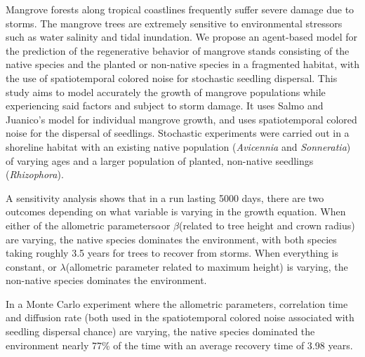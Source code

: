 Mangrove forests along tropical coastlines frequently suffer severe
damage due to storms. The mangrove trees are extremely sensitive to
environmental stressors such as water salinity and tidal inundation. We
propose an agent-based model for the prediction of the regenerative
behavior of mangrove stands consisting of the native species and the
planted or non-native species in a fragmented habitat, with the use of
spatiotemporal colored noise for stochastic seedling dispersal. This
study aims to model accurately the growth of mangrove populations while
experiencing said factors and subject to storm damage. It uses Salmo and
Juanico's model for individual mangrove growth, and uses spatiotemporal
colored noise for the dispersal of seedlings. Stochastic experiments were carried out in
a shoreline habitat with an existing native population (\emph{Avicennia}
and \emph{Sonneratia}) of varying ages and a larger population of
planted, non-native seedlings (\emph{Rhizophora}).

A sensitivity analysis shows that in a run lasting 5000 days, there are
two outcomes depending on what variable is varying in the growth
equation. When either of the allometric parameters\(\alpha\)or
\(\beta\)(related to tree height and crown radius) are varying, the
native species dominates the environment, with both species taking
roughly 3.5 years for trees to recover from storms. When everything is
constant, or \(\lambda\)(allometric parameter related to maximum height)
is varying, the non-native species dominates the environment.

In a Monte Carlo experiment where the allometric parameters, correlation
time and diffusion rate (both used in the spatiotemporal colored noise
associated with seedling dispersal chance) are varying, the native
species dominated the environment nearly 77\% of the time with an
average recovery time of 3.98 years.